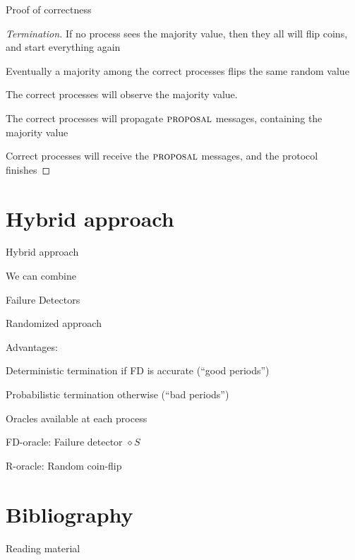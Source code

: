 \begin{frame}{Proof of correctness}
	
\begin{proof}[Termination]
\BIL
\item If no process sees the majority value, then they all will flip coins, and start everything again
\item Eventually a majority among the correct processes flips the same random value
	\BI
	\item The correct processes will observe the majority value.
	\item The correct processes will propagate $\textsc{proposal}$ messages, containing the majority value
	\EI
\item Correct processes will receive the $\textsc{proposal}$ messages, and the protocol finishes
\EIL
\end{proof}

\end{frame}

\section{Hybrid approach}

\begin{frame}{Hybrid approach}
	
\BIL
\item We can combine
	\BI
	\item Failure Detectors
	\item Randomized approach
	\EI
\item Advantages:
	\BI
	\item Deterministic termination if FD is accurate (“good periods”)
	\item Probabilistic termination otherwise (“bad periods”)
	\EI
\item Oracles available at each process
	\BI
	\item FD-oracle: Failure detector $\diamond S$
	\item R-oracle: Random coin-flip
	\EI
\EIL	


\begin{Bib}
\BI
\item {}
\EI
\end{Bib}
	
\end{frame}





\section{Bibliography}

\begin{frame}{Reading material}

\begin{Bib}
\BI
\item {}
\item {}
\EI
\end{Bib}

\invisible{

{\tiny

 
}


}

\end{frame}




